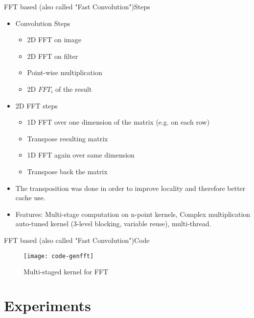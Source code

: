 \begin{frame}{FFT based (also called "Fast Convolution")}{Steps}
  \begin{itemize}
        \item {
           Convolution Steps
          }
      \begin{itemize}
          \item {
           2D FFT on image
          }
          \item {
           2D FFT on filter
          }
          \item {
           Point-wise multiplication
          }
          \item {
           2D $FFT_i$ of the result
          }
      \end{itemize}
      \item {
           2D FFT steps
          }
      \begin{itemize}
          \item {
           1D FFT over one dimension of the matrix (e.g. on each row)
          }
          \item {
           Transpose resulting matrix
          }
          \item {
           1D FFT again over same dimension
          }
          \item {
           Transpose back the matrix
          }
      \end{itemize}
       \item {
            The transposition was done in order to improve locality and therefore better cache use.
         }
          \item {
            Features: Multi-stage computation on n-point kernels, Complex multiplication auto-tuned kernel (3-level blocking, variable reuse),  multi-thread.
         }
  \end{itemize}
\end{frame}

\begin{frame}{FFT based (also called "Fast Convolution")}{Code}
\begin{figure}[ht] \label{fig1} 
\texttt{[image: code-genfft]}
 \caption{Multi-staged kernel for FFT} 
\end{figure}

\end{frame}

\section{Experiments}
